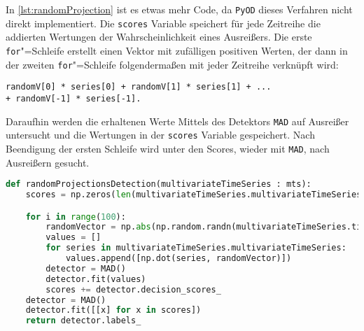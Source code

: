 In \autoref{lst:randomProjection} ist es etwas mehr Code, da \lstinline|PyOD| dieses Verfahren nicht direkt implementiert. Die \lstinline|scores| Variable speichert für jede Zeitreihe die addierten Wertungen der Wahrscheinlichkeit eines Ausreißers. Die erste \lstinline|for|"=Schleife erstellt einen Vektor mit zufälligen positiven Werten, der dann in der zweiten \lstinline|for|"=Schleife folgendermaßen mit jeder Zeitreihe verknüpft wird: 

\begin{lstlisting}
randomV[0] * series[0] + randomV[1] * series[1] + ... 
+ randomV[-1] * series[-1].
\end{lstlisting}

Daraufhin werden die erhaltenen Werte Mittels des Detektors \lstinline|MAD| auf Ausreißer untersucht und die Wertungen in der \lstinline|scores| Variable gespeichert. Nach Beendigung der ersten Schleife wird unter den Scores, wieder mit \lstinline|MAD|, nach Ausreißern gesucht.
\begin{lstlisting}[caption={Random"=Projection"=Detection}, label=lst:randomProjection, style=Python, language=Python]
def randomProjectionsDetection(multivariateTimeSeries : mts):
    scores = np.zeros(len(multivariateTimeSeries.multivariateTimeSeries))

    for i in range(100):
        randomVector = np.abs(np.random.randn(multivariateTimeSeries.timeSeriesLength))
        values = []
        for series in multivariateTimeSeries.multivariateTimeSeries:
            values.append([np.dot(series, randomVector)])
        detector = MAD()
        detector.fit(values)
        scores += detector.decision_scores_
    detector = MAD()
    detector.fit([[x] for x in scores])
    return detector.labels_
\end{lstlisting}